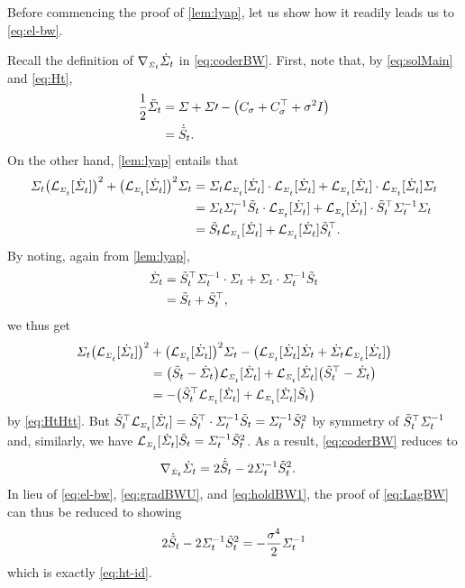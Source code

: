 Before commencing the proof of \cref{lem:lyap}, let us show how it readily leads us to \eqref{eq:el-bw}.

Recall the definition of $\nabla_{\scriptscriptstyle\dot{\Sigma}_{t}}\dot{\Sigma}_{t}$ in \eqref{eq:coderBW}. First, note that, by \eqref{eq:solMain} and \eqref{eq:Ht},
\begin{align}
\label{eq:ddot}
\frac{1}{2}\ddSigcurve &=   \Sigma+\Sigma\prime -  \parens*{  \C + \C^\top+ \sdev^2\eye }   \\
&=  \dHt.
\end{align}
On the other hand, \cref{lem:lyap} entails that
\begin{align}
\nn
\Sigcurve \parens*{\lyap}^2 + \parens*{\lyap}^2 \Sigcurve &= \Sigcurve \lyap \cdot \lyap + \lyap \cdot \lyap\Sigcurve \\
\nn
 &= \Sigcurve \Sigcurveinv \Ht \cdot \lyap + \lyap \cdot \Ht^\top \Sigcurveinv \Sigcurve \\
 \label{eq:holdBW}
 &= \Ht \lyap + \lyap \Ht^\top.
\end{align}
By noting, again from \cref{lem:lyap},
\begin{align}
\nn
\dSigcurve &= \Ht^\top \Sigcurveinv \cdot \Sigcurve + \Sigcurve \cdot \Sigcurveinv\Ht \\
\label{eq:HtHtt}
&= \Ht + \Ht^\top,
\end{align}
we thus get
\begin{align}\nn
 \Sigcurve \parens*{\lyap}^2 &+ \parens*{\lyap}^2 \Sigcurve- \parens*{  \lyap \dSigcurve + \dSigcurve\lyap } \\
 &= \parens*{\Ht - \dSigcurve} \lyap + \lyap \parens*{\Ht^\top - \dSigcurve} \\
 \nn
 &= - \parens*{ \Ht^\top\lyap + \lyap \Ht  }
\end{align}by \eqref{eq:HtHtt}. But $\Ht^\top\lyap  = \Ht^\top \cdot \Sigcurveinv \Ht =\Sigcurveinv \Ht^2$ by symmetry of $\tilde{S}_{t}^\top \Sigma^{-1}_{t}$ and, similarly, we have $\lyap\Ht =  \Sigcurveinv \Ht^2$. As a result, \eqref{eq:coderBW} reduces to
\begin{align}
\label{eq:holdBW1}
\coder &= 2\dHt - 2 \Sigcurveinv\Ht^2.
\end{align}In lieu of \eqref{eq:el-bw}, \eqref{eq:gradBWU}, and \eqref{eq:holdBW1}, the proof of \eqref{eq:LagBW} can thus be reduced to showing
\begin{align}
2\dot{\tilde{S}}_{t} -  2\Sigma^{-1}_{t}\tilde{S}_{t}^2 = -\frac{\sigma^4}{2} \Sigma^{-1}_{t}
\end{align}which is exactly \eqref{eq:ht-id}.



